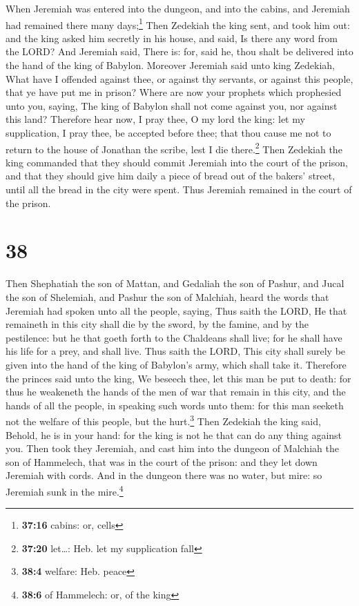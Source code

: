  When Jeremiah was entered into the dungeon, and into the
cabins, and Jeremiah had remained there many days;\footnote{\textbf{37:16}
  cabins: or, cells}  Then Zedekiah the king sent, and
took him out: and the king asked him secretly in his house, and said, Is
there any word from the LORD? And Jeremiah said, There is: for, said he,
thou shalt be delivered into the hand of the king of Babylon.
 Moreover Jeremiah said unto king Zedekiah, What have I
offended against thee, or against thy servants, or against this people,
that ye have put me in prison?  Where are now your
prophets which prophesied unto you, saying, The king of Babylon shall
not come against you, nor against this land?  Therefore
hear now, I pray thee, O my lord the king: let my supplication, I pray
thee, be accepted before thee; that thou cause me not to return to the
house of Jonathan the scribe, lest I die there.\footnote{\textbf{37:20}
  let\ldots: Heb. let my supplication fall}  Then
Zedekiah the king commanded that they should commit Jeremiah into the
court of the prison, and that they should give him daily a piece of
bread out of the bakers' street, until all the bread in the city were
spent. Thus Jeremiah remained in the court of the prison.

\hypertarget{section-37}{%
\section{38}\label{section-37}}

 Then Shephatiah the son of Mattan, and Gedaliah the son
of Pashur, and Jucal the son of Shelemiah, and Pashur the son of
Malchiah, heard the words that Jeremiah had spoken unto all the people,
saying,  Thus saith the LORD, He that remaineth in this
city shall die by the sword, by the famine, and by the pestilence: but
he that goeth forth to the Chaldeans shall live; for he shall have his
life for a prey, and shall live.  Thus saith the LORD,
This city shall surely be given into the hand of the king of Babylon's
army, which shall take it.  Therefore the princes said
unto the king, We beseech thee, let this man be put to death: for thus
he weakeneth the hands of the men of war that remain in this city, and
the hands of all the people, in speaking such words unto them: for this
man seeketh not the welfare of this people, but the hurt.\footnote{\textbf{38:4}
  welfare: Heb. peace}  Then Zedekiah the king said,
Behold, he is in your hand: for the king is not he that can do any thing
against you.  Then took they Jeremiah, and cast him into
the dungeon of Malchiah the son of Hammelech, that was in the court of
the prison: and they let down Jeremiah with cords. And in the dungeon
there was no water, but mire: so Jeremiah sunk in the mire.\footnote{\textbf{38:6}
  of Hammelech: or, of the king}

